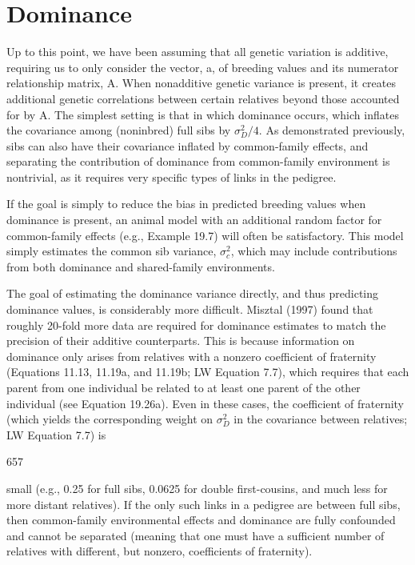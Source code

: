 \documentclass{article}
\begin{document}
\section{Dominance}
Up to this point, we have been assuming that all genetic variation is additive, requiring us to only consider the vector, a, of breeding values and its numerator relationship matrix, A. When nonadditive genetic variance is present, it creates additional genetic correlations between certain relatives beyond those accounted for by A. The simplest setting is that in which dominance occurs, which inflates the covariance among (noninbred) full sibs by  $ \sigma_D^2 / 4 $. As demonstrated previously, sibs can also have their covariance inflated by common-family effects, and separating the contribution of dominance from common-family environment is nontrivial, as it requires very specific types of links in the pedigree.

If the goal is simply to reduce the bias in predicted breeding values when dominance is present, an animal model with an additional random factor for common-family effects (e.g., Example 19.7) will often be satisfactory. This model simply estimates the common sib variance,  $ \sigma_{c}^{2} $, which may include contributions from both dominance and shared-family environments.

The goal of estimating the dominance variance directly, and thus predicting dominance values, is considerably more difficult. Misztal (1997) found that roughly 20-fold more data are required for dominance estimates to match the precision of their additive counterparts. This is because information on dominance only arises from relatives with a nonzero coefficient of fraternity (Equations 11.13, 11.19a, and 11.19b; LW Equation 7.7), which requires that each parent from one individual be related to at least one parent of the other individual (see Equation 19.26a). Even in these cases, the coefficient of fraternity (which yields the corresponding weight on  $ \sigma_{D}^{2} $ in the covariance between relatives; LW Equation 7.7) is

657

small (e.g., 0.25 for full sibs, 0.0625 for double first-cousins, and much less for more distant relatives). If the only such links in a pedigree are between full sibs, then common-family environmental effects and dominance are fully confounded and cannot be separated (meaning that one must have a sufficient number of relatives with different, but nonzero, coefficients of fraternity).
\end{document}
